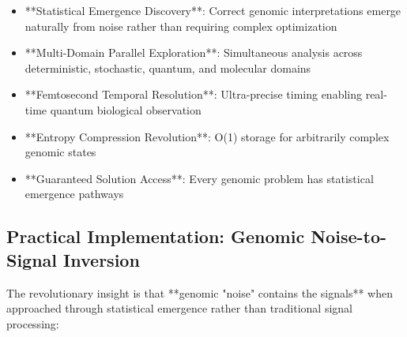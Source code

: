 \documentclass[12pt,a4paper]{article}
\begin{document}
\begin{itemize}
\item **Statistical Emergence Discovery**: Correct genomic interpretations emerge naturally from noise rather than requiring complex optimization
\item **Multi-Domain Parallel Exploration**: Simultaneous analysis across deterministic, stochastic, quantum, and molecular domains
\item **Femtosecond Temporal Resolution**: Ultra-precise timing enabling real-time quantum biological observation
\item **Entropy Compression Revolution**: O(1) storage for arbitrarily complex genomic states
\item **Guaranteed Solution Access**: Every genomic problem has statistical emergence pathways
\end{itemize}

\subsection{Practical Implementation: Genomic Noise-to-Signal Inversion}

The revolutionary insight is that **genomic "noise" contains the signals** when approached through statistical emergence rather than traditional signal processing:
\end{document}
